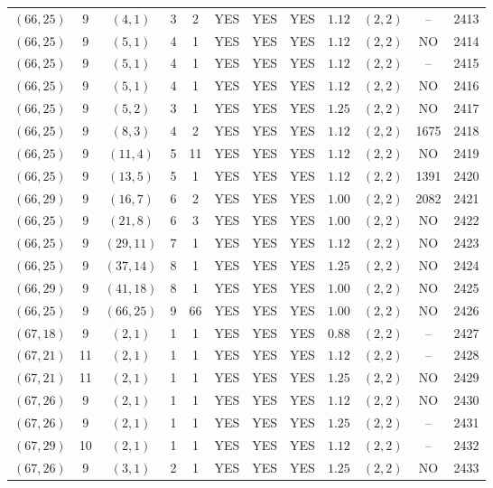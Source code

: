 \begin{longtable}{|c|c|c|c|c|c|c|c|c|c|c|c|}
$(66,25)$ & 9 & $(4,1)$ & 3 & 2 & YES & YES & YES & $1.12$ & $(2,2)$ & -- & 2413\\
$(66,25)$ & 9 & $(5,1)$ & 4 & 1 & YES & YES & YES & $1.12$ & $(2,2)$ & NO & 2414\\
$(66,25)$ & 9 & $(5,1)$ & 4 & 1 & YES & YES & YES & $1.12$ & $(2,2)$ & -- & 2415\\
$(66,25)$ & 9 & $(5,1)$ & 4 & 1 & YES & YES & YES & $1.12$ & $(2,2)$ & NO & 2416\\
$(66,25)$ & 9 & $(5,2)$ & 3 & 1 & YES & YES & YES & $1.25$ & $(2,2)$ & NO & 2417\\
$(66,25)$ & 9 & $(8,3)$ & 4 & 2 & YES & YES & YES & $1.12$ & $(2,2)$ & 1675 & 2418\\
$(66,25)$ & 9 & $(11,4)$ & 5 & 11 & YES & YES & YES & $1.12$ & $(2,2)$ & NO & 2419\\
$(66,25)$ & 9 & $(13,5)$ & 5 & 1 & YES & YES & YES & $1.12$ & $(2,2)$ & 1391 & 2420\\
$(66,29)$ & 9 & $(16,7)$ & 6 & 2 & YES & YES & YES & $1.00$ & $(2,2)$ & 2082 & 2421\\
$(66,25)$ & 9 & $(21,8)$ & 6 & 3 & YES & YES & YES & $1.00$ & $(2,2)$ & NO & 2422\\
$(66,25)$ & 9 & $(29,11)$ & 7 & 1 & YES & YES & YES & $1.12$ & $(2,2)$ & NO & 2423\\
$(66,25)$ & 9 & $(37,14)$ & 8 & 1 & YES & YES & YES & $1.25$ & $(2,2)$ & NO & 2424\\
$(66,29)$ & 9 & $(41,18)$ & 8 & 1 & YES & YES & YES & $1.00$ & $(2,2)$ & NO & 2425\\
$(66,25)$ & 9 & $(66,25)$ & 9 & 66 & YES & YES & YES & $1.00$ & $(2,2)$ & NO & 2426\\
$(67,18)$ & 9 & $(2,1)$ & 1 & 1 & YES & YES & YES & $0.88$ & $(2,2)$ & -- & 2427\\
$(67,21)$ & 11 & $(2,1)$ & 1 & 1 & YES & YES & YES & $1.12$ & $(2,2)$ & -- & 2428\\
$(67,21)$ & 11 & $(2,1)$ & 1 & 1 & YES & YES & YES & $1.25$ & $(2,2)$ & NO & 2429\\
$(67,26)$ & 9 & $(2,1)$ & 1 & 1 & YES & YES & YES & $1.12$ & $(2,2)$ & NO & 2430\\
$(67,26)$ & 9 & $(2,1)$ & 1 & 1 & YES & YES & YES & $1.25$ & $(2,2)$ & -- & 2431\\
$(67,29)$ & 10 & $(2,1)$ & 1 & 1 & YES & YES & YES & $1.12$ & $(2,2)$ & -- & 2432\\
$(67,26)$ & 9 & $(3,1)$ & 2 & 1 & YES & YES & YES & $1.25$ & $(2,2)$ & NO & 2433\\

\end{longtable}
